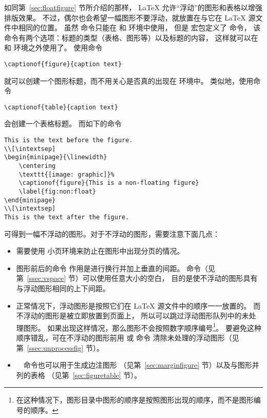 如同第~\ref{sec:floatfigure} 节所介绍的那样，
\LaTeX{} 允许“浮动”的图形和表格以增强排版效果。
不过，偶尔也会希望一幅图形不要浮动，就放置在与它在 \LaTeX{} 源文件中相同的位置。
虽然  命令只能在  和  环境中使用，
但是  宏包定义了  命令，
该命令有两个选项：标题的类型（表格、图形等）以及标题的内容，
这样就可以在  和  环境之外使用了。
使用命令
\begin{lstlisting}
\captionof{figure}{caption text}
\end{lstlisting}
就可以创建一个图形标题，而不用关心是否真的出现在  环境中。
类似地，使用命令
\begin{lstlisting}
\captionof{table}{caption text}
\end{lstlisting}
会创建一个表格标题。
而如下的命令
\begin{lstlisting}
This is the text before the figure.
\\[\intextsep]
\begin{minipage}{\linewidth}
	\centering
	\texttt{[image: graphic]}%
	\captionof{figure}{This is a non-floating figure}
	\label{fig:non:float}
\end{minipage}
\\[\intextsep]
This is the text after the figure.
\end{lstlisting}
可得到一幅不浮动的图形。对于不浮动的图形，需要注意下面几点：
\begin{itemize}
	\item 需要使用  小页环境来防止在图形中出现分页的情况。
	\item 图形前后的命令  作用是进行换行并加上垂直的间距。
	 命令（见第~\ref{ssec:vspace} 节）可以使用任意大小的空白，
	目的是使不浮动的图形具有与浮动图形相同的上下间距。
	\item 正常情况下，浮动图形是按照它们在 \LaTeX{} 源文件中的顺序一一放置的。
	而不浮动的图形是被立即放置到页面上，
	所以可以跳过浮动图形队列中的未处理图形。
	如果出现这样情况，那么图形不会按照数字顺序编号\footnote{
		在这种情况下，图形目录中图形的顺序是按照图形出现的顺序，而不是图形编号的顺序。}。
	要避免这种顺序错乱，可在不浮动的图形前用  或  命令
	清除未处理的浮动图形（见第~\ref{ssec:unprocessfig} 节）。
	\item {}　命令也可以用于生成边注图形
	（见第~\ref{sec:marginfigure} 节）以及与图形并列的表格
	（见第~\ref{sec:figuretable} 节）。
\end{itemize}

